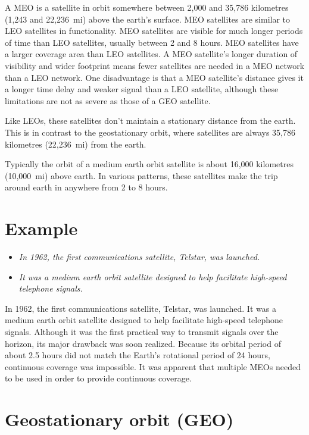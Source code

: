 A MEO is a satellite in orbit somewhere between 2,000 and 35,786
kilometres (1,243 and 22,236~mi) above the earth's surface. MEO
satellites are similar to LEO satellites in functionality. MEO
satellites are visible for much longer periods of time than LEO
satellites, usually between 2 and 8 hours. MEO satellites have a larger
coverage area than LEO satellites. A MEO satellite's longer duration of
visibility and wider footprint means fewer satellites are needed in a
MEO network than a LEO network. One disadvantage is that a MEO
satellite's distance gives it a longer time delay and weaker signal than
a LEO satellite, although these limitations are not as severe as those
of a GEO satellite.

Like LEOs, these satellites don't maintain a stationary distance from
the earth. This is in contrast to the geostationary orbit, where
satellites are always 35,786 kilometres (22,236~mi) from the earth.

Typically the orbit of a medium earth orbit satellite is about 16,000
kilometres (10,000~mi) above earth. In various patterns, these
satellites make the trip around earth in anywhere from 2 to 8 hours.

\section{Example}\label{example}

\begin{itemize}
\item
  \emph{In 1962, the first communications satellite, Telstar, was
  launched.}
\item
  \emph{It was a medium earth orbit satellite designed to help
  facilitate high-speed telephone signals.}
\end{itemize}

In 1962, the first communications satellite, Telstar, was launched. It
was a medium earth orbit satellite designed to help facilitate
high-speed telephone signals. Although it was the first practical way to
transmit signals over the horizon, its major drawback was soon realized.
Because its orbital period of about 2.5 hours did not match the Earth's
rotational period of 24 hours, continuous coverage was impossible. It
was apparent that multiple MEOs needed to be used in order to provide
continuous coverage.

\section{Geostationary orbit (GEO)}\label{geostationary-orbit-geo}

